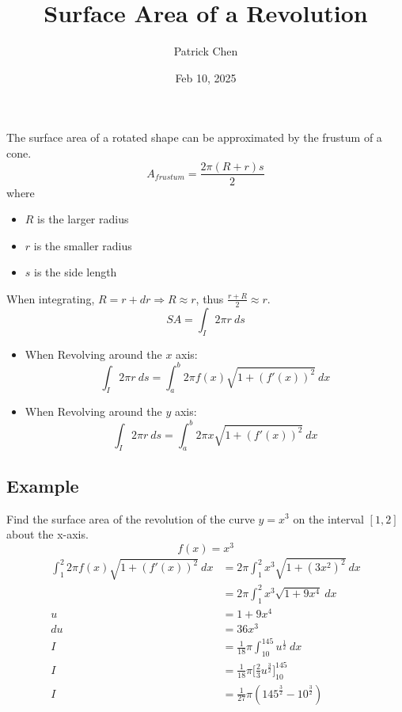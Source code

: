 \documentclass{article}
\title{Surface Area of a Revolution}
\author{Patrick Chen}
\date{Feb 10, 2025}
\theoremstyle{mytheoremstyle}
\theoremstyle{mytheoremstyle}
\theoremstyle{myproblemstyle}
\begin{document}
    \maketitle
    The surface area of a rotated shape can be approximated by the frustum of a
    cone.
    \[
        A_{frustum} = \frac{2\pi(R+r)s}{2}
    \]
    where
    \begin{itemize}
        \item $R$ is the larger radius
        \item $r$ is the smaller radius
        \item $s$ is the side length
    \end{itemize}
    When integrating, $R=r+dr\Rightarrow R\approx r$, thus $\frac{r+R}{2} \approx r$.
    \[
        SA = \int_I 2\pi r \ ds
    \]
    \begin{itemize}
        \item When Revolving around the $x$ axis:
            \[
                \int_I 2\pi r \ ds = \int_{a}^{b} 2\pi f(x) \sqrt{1+(f'(x))^2} \ dx
            \]
        \item When Revolving around the $y$ axis:
            \[
                \int_I 2\pi r \ ds = \int_{a}^{b} 2\pi x \sqrt{1+(f'(x))^2} \ dx
            \]
    \end{itemize}

    \subsection*{Example}
    Find the surface area of the revolution of the curve $y=x^3$ on the
    interval $[1,2]$ about the x-axis.
    \[
        f(x) = x^3
    \]
    \begin{align*}
        \int_{1}^{2} 2\pi f(x) \sqrt{1+(f'(x))^2} \ dx
        &= 2\pi \int_{1}^{2} x^3 \sqrt{1+(3x^2)^2} \ dx \\
        &= 2\pi \int_{1}^{2} x^3 \sqrt{1 + 9x^4} \ dx \\
        u &= 1 + 9x^4 \\
        du &= 36x^3 \\
        I &= \frac{1}{18} \pi \int_{10}^{145} u^{\frac{1}{2}} \ dx \\
        I &= \frac{1}{18} \pi \Big[ \frac{2}{3} u^{\frac{3}{2}}\Big]_{10}^{145} \\
        I &= \frac{1}{27} \pi (145^{\frac{3}{2}} - 10^{\frac{3}{2}})
    \end{align*}
\end{document}
